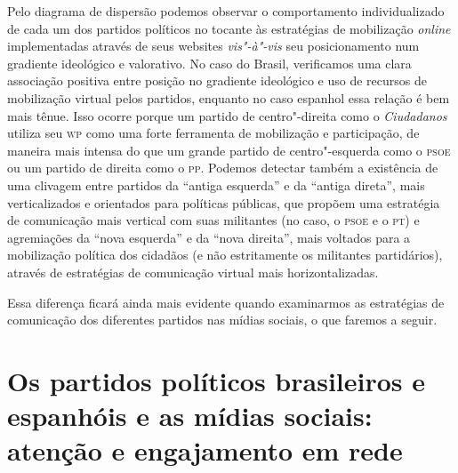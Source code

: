 Pelo diagrama de dispersão podemos observar o comportamento
individualizado de cada um dos partidos políticos no tocante às
estratégias de mobilização \emph{online} implementadas através de seus websites
\emph{vis"-à"-vis} seu posicionamento num gradiente ideológico e
valorativo. No caso do Brasil, verificamos uma clara associação positiva
entre posição no gradiente ideológico e uso de recursos de mobilização
virtual pelos partidos, enquanto no caso espanhol essa relação é bem
mais tênue. Isso ocorre porque um partido de centro"-direita como o
\emph{Ciudadanos} utiliza seu \textsc{wp} como uma forte ferramenta de
mobilização e participação, de maneira mais intensa do que um grande
partido de centro"-esquerda como o \textsc{psoe} ou um partido de direita como o
\textsc{pp}. Podemos detectar também a existência de uma clivagem entre partidos
da ``antiga esquerda'' e da ``antiga direta'', mais verticalizados e
orientados para políticas públicas, que propõem uma estratégia de
comunicação mais vertical com suas militantes (no caso, o \textsc{psoe} e o \textsc{pt}) e
agremiações da ``nova esquerda'' e da ``nova direita'', mais voltados
para a mobilização política dos cidadãos (e não estritamente os
militantes partidários), através de estratégias de comunicação virtual
mais horizontalizadas.

Essa diferença ficará ainda mais evidente quando examinarmos as
estratégias de comunicação dos diferentes partidos nas mídias sociais, o
que faremos a seguir.

\section{Os partidos políticos brasileiros e espanhóis e as mídias sociais:
atenção e engajamento em rede}

